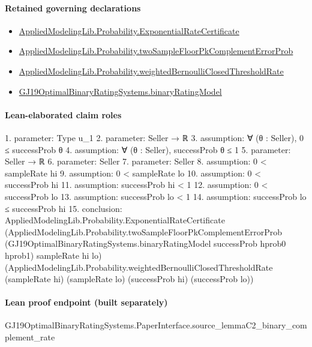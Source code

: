 \documentclass[10pt]{article}
\begin{document}
\paragraph{Retained governing declarations}
\begin{itemize}\raggedright
\item \hyperlink{governing-declaration-330a08568e50e95e}{Applied\allowbreak{}Modeling\allowbreak{}Lib.\allowbreak{}Probability.\allowbreak{}Exponential\allowbreak{}Rate\allowbreak{}Certificate}
\item \hyperlink{governing-declaration-ca64119571aefd8e}{Applied\allowbreak{}Modeling\allowbreak{}Lib.\allowbreak{}Probability.\allowbreak{}two\allowbreak{}Sample\allowbreak{}Floor\allowbreak{}Pk\allowbreak{}Complement\allowbreak{}Error\allowbreak{}Prob}
\item \hyperlink{governing-declaration-40edb12d31a5e6d9}{Applied\allowbreak{}Modeling\allowbreak{}Lib.\allowbreak{}Probability.\allowbreak{}weighted\allowbreak{}Bernoulli\allowbreak{}Closed\allowbreak{}Threshold\allowbreak{}Rate}
\item \hyperlink{governing-declaration-de9c5ce9af253833}{GJ19\allowbreak{}Optimal\allowbreak{}Binary\allowbreak{}Rating\allowbreak{}Systems.\allowbreak{}binary\allowbreak{}Rating\allowbreak{}Model}
\end{itemize}
\paragraph{Lean-elaborated claim roles}\begin{ReviewVerbatim}
1. parameter: Type u_1
2. parameter: Seller → ℝ
3. assumption: ∀ (θ : Seller), 0 ≤ successProb θ
4. assumption: ∀ (θ : Seller), successProb θ ≤ 1
5. parameter: Seller → ℝ
6. parameter: Seller
7. parameter: Seller
8. assumption: 0 < sampleRate hi
9. assumption: 0 < sampleRate lo
10. assumption: 0 < successProb hi
11. assumption: successProb hi < 1
12. assumption: 0 < successProb lo
13. assumption: successProb lo < 1
14. assumption: successProb lo ≤ successProb hi
15. conclusion: AppliedModelingLib.Probability.ExponentialRateCertificate
  (AppliedModelingLib.Probability.twoSampleFloorPkComplementErrorProb
    (GJ19OptimalBinaryRatingSystems.binaryRatingModel successProb hprob0 hprob1) sampleRate hi lo)
  (AppliedModelingLib.Probability.weightedBernoulliClosedThresholdRate (sampleRate hi) (sampleRate lo) (successProb hi)
    (successProb lo))
\end{ReviewVerbatim}

\paragraph{Lean proof endpoint (built separately)}\begin{ReviewVerbatim}
GJ19OptimalBinaryRatingSystems.PaperInterface.source_lemmaC2_binary_complement_rate
\end{ReviewVerbatim}
\end{document}
